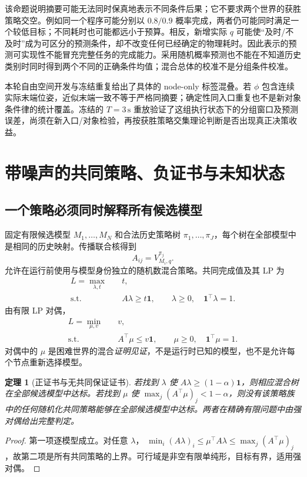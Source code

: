 \documentclass[11pt,a4paper,fontset=fandol]{ctexart}
\newtheorem{theorem}{定理}[section]
\theoremstyle{definition}
\theoremstyle{remark}\newtheorem{remark}[theorem]{说明}
\numberwithin{equation}{section}
\begin{document}
该命题说明摘要可能无法同时保真地表示不同条件后果；它不要求两个世界的获胜策略交空。例如同一个程序可能分别以 $0.8/0.9$ 概率完成，两者仍可能同时满足一个较低目标；不同耗时也可能都远小于预算。相反，新增实际 $q$ 可能使“及时/不及时”成为可区分的预测条件，却不改变任何已经确定的物理耗时。因此表示的预测可实现性不能冒充完整任务的完成能力。采用随机概率预测也不能在不知道历史类别时同时得到两个不同的正确条件均值；混合总体的校准不是分组条件校准。

本轮自由空间开发与冻结重复给出了具体的 node-only 标签混叠。若 $\phi$ 包含连续实际末端位姿，近似末端一致不等于严格同摘要；确定性同入口重复也不是新对象条件律的统计覆盖。冻结的 $T=3\,\mathrm{s}$ 重放验证了这组执行状态下的分组窗口及预测误差，尚须在新入口/对象检验，再按获胜策略交集理论判断是否出现真正决策收益。

\section{带噪声的共同策略、负证书与未知状态}
\label{sec:lp}
\subsection{一个策略必须同时解释所有候选模型}
固定有限候选模型 $M_1,\ldots,M_N$ 和合法历史策略树 $\pi_1,\ldots,\pi_J$，每个树在全部模型中是相同的历史映射。传播联合核得到
\begin{equation}
 A_{ij}=V_{M_i,q}^{\pi_j}.
\end{equation}
允许在运行前使用与模型身份独立的随机数混合策略。共同完成值及其 LP 为
\begin{align}
 L=\max_{\lambda,t}\quad&t,\nonumber\\
 \text{s.t.}\quad&A\lambda\ge t\mathbf1,\qquad
 \lambda\ge0,\quad\mathbf1^\top\lambda=1.
 \label{eq:lp_primal}
\end{align}
由有限 LP 对偶，
\begin{align}
 L=\min_{\mu,v}\quad&v,\nonumber\\
 \text{s.t.}\quad&A^\top\mu\le v\mathbf1,\qquad
 \mu\ge0,\quad\mathbf1^\top\mu=1.
 \label{eq:lp_dual}
\end{align}
对偶中的 $\mu$ 是困难世界的混合\emph{证明见证}，不是运行时已知的模型，也不是允许每个节点重新选择模型。

\begin{theorem}[正证书与无共同保证证书]
\label{thm:dual}
若找到 $\lambda$ 使 $A\lambda\ge(1-\alpha)\mathbf1$，则相应混合树在全部候选模型中达标。若找到 $\mu$ 使 $\max_j(A^\top\mu)_j<1-\alpha$，则没有该策略族中的任何随机化共同策略能够在全部候选模型中达标。两者在精确有限问题中由强对偶给出完整判定。
\end{theorem}
\begin{proof}
第一项逐模型成立。对任意 $\lambda$，
$\min_i(A\lambda)_i\le\mu^\top A\lambda\le\max_j(A^\top\mu)_j$，故第二项是所有共同策略的上界。可行域是非空有限单纯形，目标有界，适用强对偶。
\end{proof}
\end{document}
